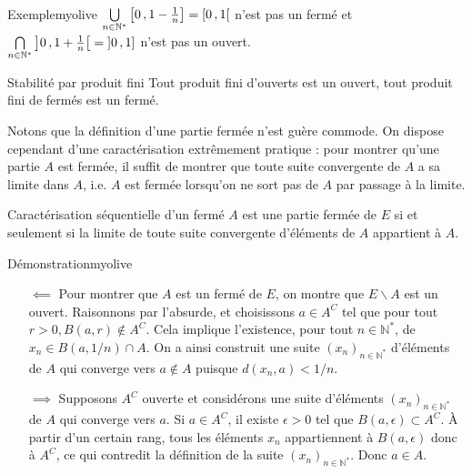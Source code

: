     \begin{omed}{Exemple}{myolive}
        $\bigcup\limits_{n \in \mathbb{N}^*} \left[ 0 \, , 1-\frac{1}{n} \right] = \left[ 0 \, , 1 \right[$ n’est pas un fermé et $\bigcap\limits_{n \in \mathbb{N}^*} \left] 0 \, , 1 + \frac{1}{n} \right[ = \left] 0 \, , 1 \right]$ n’est pas un ouvert.
    \end{omed}

    \begin{prop}{Stabilité par produit fini}
        Tout produit fini d’ouverts est un ouvert, tout produit fini de fermés est un fermé.
    \end{prop}

    Notons que la définition d’une partie fermée n’est guère commode. On dispose cependant d’une caractérisation extrêmement pratique : pour montrer qu’une partie $A$ est fermée, il suffit de montrer que toute suite convergente de $A$ a sa limite dans $A$, i.e. $A$ est fermée lorsqu’on ne sort pas de $A$ par passage à la limite.

    \begin{prop}{Caractérisation séquentielle d’un fermé}{}
        $A$ est une partie fermée de $E$ si et seulement si la limite de toute suite convergente d’éléments de $A$ appartient à $A$.
    \end{prop}

    \begin{demo}{Démonstration}{myolive}
        \begin{itemize}
            \item[$\impliedby$] Pour montrer que $A$ est un fermé de $E$, on montre que $E \backslash A$ est un ouvert. Raisonnons par l’absurde, et choisissons $a \in A^C$ tel que pour tout $r > 0, B(a,r) \notin A^C$. Cela implique l’existence, pour tout $n \in \mathbb{N}^*$, de $x_n \in B(a,1/n) \cap A$. On a ainsi construit une suite $(x_n)_{n \in \mathbb{N}^*}$ d’éléments de $A$ qui converge vers $a \notin A$ puisque $d(x_n,a) < 1/n$.
            \item[$\implies$] Supposons $A^C$ ouverte et considérons une suite d’éléments $(x_n)_{n \in \mathbb{N}^*}$ de $A$ qui converge vers $a$. Si $a \in A^C$, il existe $\epsilon > 0$ tel que $B(a,\epsilon) \subset A^C$. À partir d’un certain rang, tous les éléments $x_n$ appartiennent à $B(a,\epsilon)$ donc à $A^C$, ce qui contredit la définition de la suite $(x_n)_{n \in \mathbb{N}^*}$. Donc $a \in A$. 
        \end{itemize}
    \end{demo}

